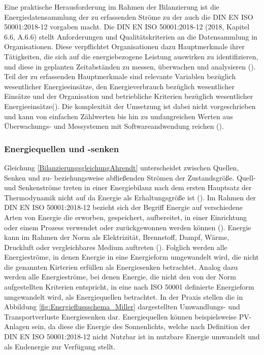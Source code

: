 Eine praktische Herausforderung im Rahmen der Bilanzierung ist die Energiedatensammlung der zu erfassenden Ströme zu der auch die DIN EN ISO 50001:2018-12 vorgaben macht. 
Die DIN EN ISO 50001:2018-12 (2018, Kapitel 6.6, A.6.6) stellt Anforderungen und Qualitätskriterien an die Datensammlung in Organisationen.
Diese verpflichtet Organisationen dazu Hauptmerkmale ihrer Tätigkeiten, die sich auf die energiebezogene Leistung auswirken zu identifizieren, und diese in geplanten 
Zeitabständen zu messen, überwachen und analysieren (\cite[S. 23]{DIN50001.2018}).
Teil der zu erfassenden Hauptmerkmale sind relevante Variablen bezüglich wesentlicher Energieeinsätze, den Energieverbrauch bezüglich wesentlicher Einsätze 
und der Organisation und betriebliche Kriterien bezüglich wesentlicher Energieeinsätze(\cite[S. 23]{DIN50001.2018}).
Die komplexität der Umsetzung ist dabei nicht vorgeschrieben und kann von einfachen Zählwerten bis hin zu umfangreichen Werten aus Überwachungs- und Messystemen mit 
Softwareandwendung reichen (\cite[S. 36]{DIN50001.2018}).


\subsubsection{Energiequellen und -senken}
Gleichung \eqref{BilanzierungsgleichungAhrendt} unterscheidet zwischen Quellen, Senken und zu- beziehungsweise abfließenden Strömen der Zustandsgröße. 
Quell- und Senkenströme treten in einer Energiebilanz nach dem ersten Hauptsatz der Thermodynamik nicht auf da Energie als Erhaltungsgröße ist (\cite[S. 14]{Ahrendts.2014}). 
Im Rahmen der DIN EN ISO 50001:2018-12 bezieht sich der Begriff Energie auf verschiedene Arten von Energie die erworben, gespeichert, aufbereitet, in einer Einrichtung oder einem Prozess verwendet 
oder zurückgewonnen werden können (\cite[Kapitel 3.5.1]{DIN50001.2018}). Energie kann im Rahmen der Norm als Elektrizität, Brennstoff, Dampf, Wärme, Druckluft oder vergleichbares Medium auftreten 
(\cite[Kapitel 3.5.1]{DIN50001.2018}).
Folglich werden alle Energieströme, in denen Energie in eine Energieform umgewandelt wird, die nicht die genannten Kirterien erfüllen als Energiesenken betrachtet. 
Analog dazu werden alle Energieströme, bei denen Energie, die nicht den von der Norm aufgestellten Kriterien entspricht, in eine nach ISO 50001 definierte Energieform 
umgewandelt wird, als Energiequellen betrachtet.
In der Praxis stellen die in Abbildung \eqref{fig:Energieflussschema_Miller} dargestellten Umwandlungs- und Transportverluste Energiesenken dar. Energiequellen können beispielsweise 
PV-Anlagen sein, da diese die Energie des Sonnenlichts, welche nach Definition der DIN EN ISO 50001:2018-12 nicht Nutzbar ist in nutzbare Energie umwandelt und als 
Endenergie zur Verfügung stellt.

